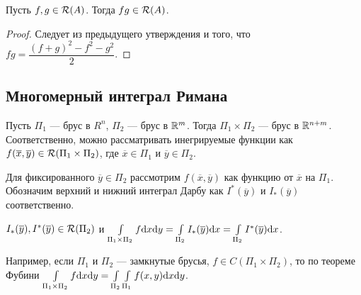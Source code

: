 \begin{Statement}
Пусть $f, g \in \mathcal{R}(A)$. Тогда $fg \in \mathcal{R}(A)$.
\end{Statement}
\begin{proof}
Следует из предыдущего утверждения и того, что $fg = \dfrac{(f + g)^2 - f^2 - g^2}{2}$.
\end{proof}

\subsection{Многомерный интеграл Римана}
Пусть $\Pi_1$ --- брус в $R^n$, $\Pi_2$ --- брус в $\mathbb{R}^m$. Тогда $\Pi_1 \times \Pi_2$ --- брус в $\mathbb{R}^{n + m}$. Соответственно, можно рассматривать инегрируемые функции как $f(\overline{x}, \overline{y}) \in \mathcal{R}(\Pi_1 \times \Pi_2)$, где $\overline{x} \in \Pi_1$ и $\overline{y} \in \Pi_2$.


Для фиксированного $\overline{y} \in \Pi_2$ рассмотрим $f(\overline{x}, \overline{y})$ как функцию от $\overline{x}$ на $\Pi_1$. Обозначим верхний и нижний интеграл Дарбу как $I^*(\overline{y})$ и $I_*(\overline{y})$ соответственно.

\begin{Theorem}[Фубини]
$I_*(\overline y), I^*(\overline{y}) \in \mathcal{R}(\Pi_2)$ и $\int\limits_{\Pi_1 \times \Pi_2}f\mathrm{d}x\mathrm{d} y = \int\limits_{\Pi_2} I_*(\overline{y})\mathrm{d}x = \int\limits_{\Pi_2} I^*(\overline{y})\mathrm{d}x$.
\end{Theorem}
Например, если $\Pi_1$ и $\Pi_2$ --- замкнутые брусья, $f \in C(\Pi_1 \times \Pi_2)$, то по теореме Фубини $\int\limits_{\Pi_1 \times \Pi_2}f\mathrm{d}x \mathrm{d} y = \int\limits_{\Pi_2}\int\limits_{\Pi_1}f(x, y)\mathrm{d}x \mathrm{d} y$.

